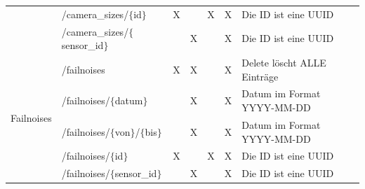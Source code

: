 \begin{landscape}
\begin{table}[H]
\begin{longtable}{lllllll}
                                      & /camera\_sizes/$\{$id$\}$               & X &   & X & X & Die ID ist eine UUID                                                    \\
                                      & /camera\_sizes/$\{$sensor\_id$\}$       &   & X &   & X & Die ID ist eine UUID                                                    \\ \midrule
      \multirow{5}{*}{Failnoises}     & /failnoises                             & X & X &   & X & Delete löscht ALLE Einträge                                             \\
                                      & /failnoises/$\{$datum$\}$               &   & X &   & X & Datum im Format YYYY-MM-DD                                              \\
                                      & /failnoises/$\{$von$\}$/$\{$bis$\}$     &   & X &   & X & Datum im Format YYYY-MM-DD                                              \\
                                      & /failnoises/$\{$id$\}$                  & X &   & X & X & Die ID ist eine UUID                                                    \\
                                      & /failnoises/$\{$sensor\_id$\}$          &   & X &   & X & Die ID ist eine UUID                                                    \\ \midrule
    \end{longtable}
  \end{table}

  \newpage


\end{landscape}

